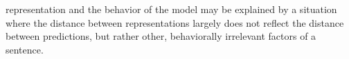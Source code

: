 representation and the behavior of the model may be explained by a situation where the distance between representations largely does not reflect the distance between predictions, but rather other, behaviorally irrelevant factors of a sentence.




% 


